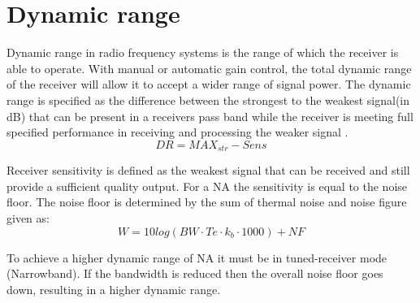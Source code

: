 \section{Dynamic range}

Dynamic range in radio frequency systems is the range of which the receiver is able to operate. With manual or automatic gain control, the total dynamic range of the receiver will allow it to accept a wider range of signal power. The dynamic range is specified as the difference between the strongest to the weakest signal(in dB) that can be present in a receivers pass band while the receiver is meeting full specified performance in receiving and processing the weaker signal \citep{DyR}.
\begin{equation}
DR = MAX_{str} -Sens
\label{Dynamic_range_def}
\end{equation}
\begin{where}
\end{where}





Receiver sensitivity is defined as the weakest signal that can be received and still provide a sufficient quality output. For a \gls{NA} the sensitivity is equal to the noise floor. The noise floor is determined by the sum of thermal noise and noise figure given as:
\begin{equation}
W = 10log(BW\cdot Te\cdot k_b\cdot 1000) + NF 
\label{Noise1}
\end{equation}
\begin{where}
\end{where}

To achieve a higher dynamic range of \gls{NA} it must be in tuned-receiver mode (Narrowband). If the bandwidth is reduced then the overall noise floor goes down, resulting in a higher dynamic range. \citep{AgilentNVA} \\


